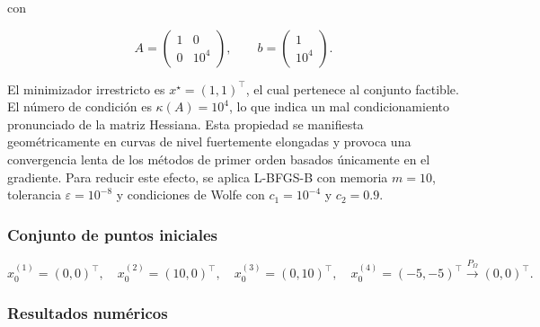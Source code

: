 \documentclass[
  spanish,
  us-letterpaper,
]{scrreprt}
\numberwithin{equation}{section}
\begin{document}
con

\[
A = 
\begin{pmatrix}
1 & 0 \\
0 & 10^4
\end{pmatrix},
\qquad
b =
\begin{pmatrix}
1 \\ 10^4
\end{pmatrix}.
\]

El minimizador irrestricto es \(x^\star = (1,1)^\top\), el cual
pertenece al conjunto factible. El número de condición es
\(\kappa(A) = 10^4\), lo que indica un mal condicionamiento pronunciado
de la matriz Hessiana. Esta propiedad se manifiesta geométricamente en
curvas de nivel fuertemente elongadas y provoca una convergencia lenta
de los métodos de primer orden basados únicamente en el gradiente. Para
reducir este efecto, se aplica L-BFGS-B con memoria \(m = 10\),
tolerancia \(\varepsilon = 10^{-8}\) y condiciones de Wolfe con
\(c_1 = 10^{-4}\) y \(c_2 = 0.9\).

\subsubsection{Conjunto de puntos
iniciales}\label{conjunto-de-puntos-iniciales}

\[
x_0^{(1)} = (0,0)^\top, \quad
x_0^{(2)} = (10,0)^\top, \quad
x_0^{(3)} = (0,10)^\top, \quad
x_0^{(4)} = (-5,-5)^\top \xrightarrow{P_\Omega} (0,0)^\top.
\]

\subsubsection{Resultados numéricos}\label{resultados-numuxe9ricos}
\end{document}
